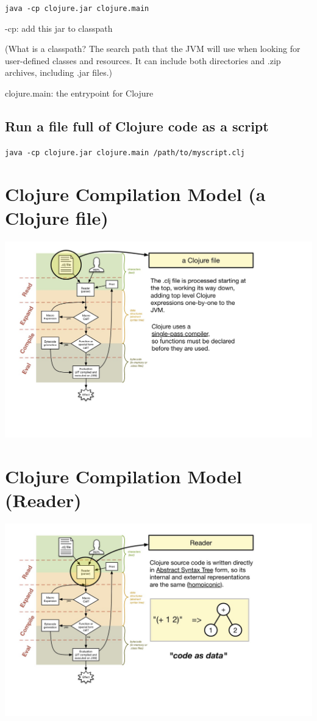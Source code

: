 \documentclass[11pt]{article}
\begin{document}
\texttt{java -cp clojure.jar clojure.main}

-cp: add this jar to classpath

(What is a classpath? The search path that the JVM will use when looking
for user-defined classes  and resources. It can include both directories
and .zip archives, including .jar files.)

clojure.main: the entrypoint for Clojure

\subsection{Run a file full of Clojure code as a script}
\label{sec:orgheadline9}

\texttt{java -cp clojure.jar clojure.main /path/to/myscript.clj}

\section{Clojure Compilation Model (a Clojure file)}
\label{sec:orgheadline11}
\hspace*{-4cm}
	\includegraphics[width=1.9\linewidth]{IMG_0109.JPG}

\section{Clojure Compilation Model (Reader)}
\label{sec:orgheadline12}
\hspace*{-4cm}\includegraphics[width=1.9\linewidth]{IMG_0110.JPG}
\end{document}
